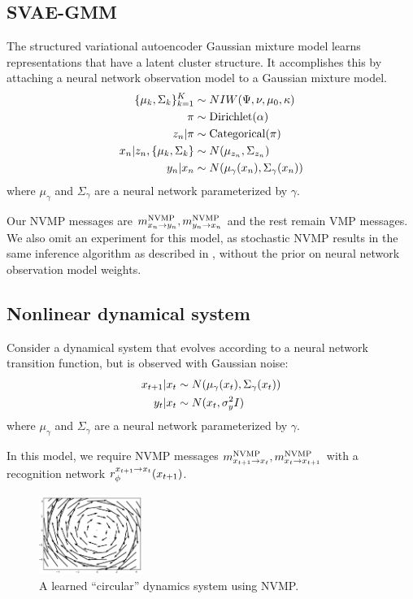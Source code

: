 \subsection{SVAE-GMM}
The structured variational autoencoder Gaussian mixture model \citep[SVAE-GMM; ][]{Johnson2016} learns representations
that have a latent cluster structure.
It accomplishes this by attaching a neural network observation model
to a Gaussian mixture model.
\begin{align*}
    \{\mu_k, \Sigma_k\}_{k = 1}^K &\sim NIW(\Psi, \nu, \mu_0, \kappa) \\
    \pi &\sim \text{Dirichlet}(\alpha) \\
    z_n | \pi &\sim \text{Categorical}(\pi) \\
    x_n | z_n, \{\mu_k, \Sigma_k\} &\sim N(\mu_{z_n}, \Sigma_{z_n}) \\
    y_n | x_n &\sim N(\mu_\gamma(x_n), \Sigma_\gamma(x_n))
\end{align*}
where $\mu_\gamma$ and $\Sigma_\gamma$ are a neural network parameterized by $\gamma$.

Our NVMP messages are $m^{\text{NVMP}}_{x_n \rightarrow y_n}, m^{\text{NVMP}}_{y_n \rightarrow x_n}$
and the rest remain VMP messages. We also omit an experiment
for this model, as stochastic NVMP
results in the same inference algorithm as described in \citet{Johnson2016},
without the prior on neural network observation model weights.

\subsection{Nonlinear dynamical system}
Consider a dynamical system that evolves
according to a neural
network transition function, but is observed with Gaussian noise:
\begin{align*}
    x_{t + 1} | x_t &\sim N(\mu_\gamma(x_t), \Sigma_\gamma(x_t)) \\
    y_t | x_t &\sim N(x_t, \sigma^2_yI)
\end{align*}
where $\mu_\gamma$ and $\Sigma_\gamma$ are a neural network parameterized by $\gamma$.

In this model, we require NVMP messages $m^{\text{NVMP}}_{x_{t + 1} \rightarrow x_t}, m^{\text{NVMP}}_{x_t \rightarrow x_{t + 1}}$ with a recognition network $r^{x_{t + 1} \rightarrow x_t}_\phi(x_{t + 1})$.

\begin{figure}
    \centering
    \includegraphics[width=0.3\textwidth]{img/nvmp/nlds}
    \caption{A learned ``circular'' dynamics system using NVMP.}
    \label{fig:nlds}
\end{figure}

